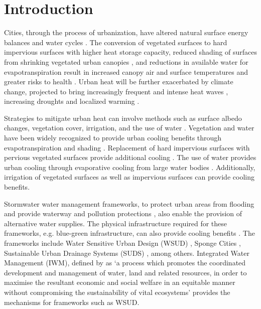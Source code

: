 \documentclass[utf8]{frontiersSCNS} %
\begin{document}
\section{Introduction}

Cities, through the process of urbanization, have altered natural surface energy balances \citep{Oke1982,Oke1989} and water cycles \citep{Coutts2012}. The conversion of vegetated surfaces to hard impervious surfaces with higher heat storage capacity, reduced shading of surfaces from shrinking vegetated urban canopies \citep{Brunner2013}, and reductions in available water for evapotranspiration \citep{Spronken-Smith2010,Middel2019a,Cheung2022b} result in increased canopy air and surface temperatures \cite{Martilli2020,Nice2022a} and greater risks to health \citep{Nicholls2008,Loughnan2010,Nazarian2022}. Urban heat will be further exacerbated by climate change, projected to bring increasingly frequent and intense heat waves \citep{Perkins-Kirkpatrick2020}, increasing droughts \citep{IPCC2021} and localized warming \citep{Zhao2021}.

Strategies to mitigate urban heat can involve methods such as surface albedo changes, vegetation cover, irrigation, and the use of water \citep{Krayenhoff2021}. Vegetation and water have been widely recognized to provide urban cooling benefits through evapotranspiration and shading \citep{Bowler2010,Coutts2012,Coutts2015}. Replacement of hard impervious surfaces with pervious vegetated surfaces provide additional cooling \citep{Middel2019a}. The use of water provides urban cooling through evaporative cooling from large water bodies \citep{Theeuwes2013,Volker2013}. Additionally, irrigation of vegetated surfaces \citep{Broadbent2017a,Cheung2021} as well as impervious surfaces \citep{Hendel2016,Solcerova2018} can provide cooling benefits.

Stormwater water management frameworks, to protect urban areas from flooding and provide waterway and pollution protections \citep{Whiteoak2019b,Renouf2020a}, also enable the provision of alternative water supplies. The physical infrastructure required for these frameworks, e.g. blue-green infrastructure, can also provide cooling benefits \citep{Jamei2019,Probst2022}. The frameworks include  Water Sensitive Urban Design (WSUD) \citep{Wong2009,Newton2020}, Sponge Cities \citep{Jia2020}, Sustainable Urban Drainage Systems (SUDS) \citep{Woods-Ballard2007}, among others. Integrated Water Management (IWM), defined by \cite{GWP2000} as `a process which promotes the coordinated development and management of water, land and related resources, in order to maximise the resultant economic and social welfare in an equitable manner without compromising the sustainability of vital ecosystems' provides the mechanisms for frameworks such as WSUD.
\end{document}
